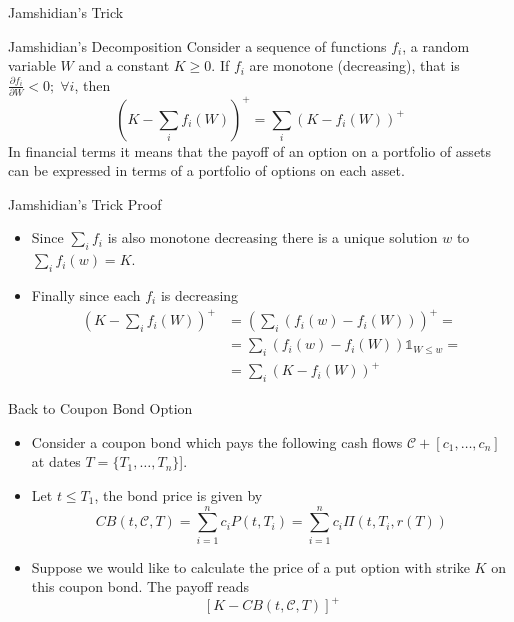 \documentclass{beamer}
\begin{document}
\begin{frame}{Jamshidian's Trick}
	\begin{block}{Jamshidian's Decomposition}
		Consider a sequence of functions $f_i$, a random variable $W$ and a constant $K\ge0$. If $f_i$ are monotone (decreasing), that is $\frac{\partial f_i}{\partial W} < 0;\;\forall i$, then 
		\begin{equation*}
			\left(K - \sum_i f_i(W)\right)^+ = 	\sum_i \left(K - f_i(W)\right)^+
		\end{equation*} 
		In financial terms it means that the payoff of an option on a portfolio of assets can be expressed in terms of a portfolio of options on each asset.
	\end{block}
\end{frame}

\begin{frame}{Jamshidian's Trick Proof}
	\begin{itemize}
	\item Since $\sum_i f_i$ is also monotone decreasing there is a unique solution $w$ to $\sum_i f_i(w) = K$.
	\item Finally since each $f_i$ is decreasing
	\begin{equation*}
		\begin{aligned}
		\left(K - \sum_i f_i(W)\right)^+ &= \left(\sum_i (f_i(w) -  f_i(W))\right)^+ = \\ 
		&= \sum_i (f_i(w) - f_i(W))\mathbb{1}_{W\le w} = \\ 
		&= \sum_i \left(K - f_i(W)\right)^+
		\end{aligned}
	\end{equation*}
\end{itemize}
\end{frame}

\begin{frame}{Back to Coupon Bond Option}
	\begin{itemize}
		\item Consider a coupon bond which pays the following cash flows $\mathcal{C}+[c_1,\dots,c_n]$ at dates $T=\{T_1,\ldots,T_n\}$].
		\item Let $t\leq T_1$, the bond price is given by
		\begin{equation*}
			CB(t,\mathcal{C},T)=\sum_{i=1}^n c_i P(t,T_i) =\sum_{i=1}^n c_i \Pi(t, T_i, r(T))
		\end{equation*}
		\item Suppose we would like to calculate the price of a put option with strike $K$ on this coupon bond. The payoff reads
		\begin{equation*}
			\left[K-CB(t,\mathcal{C},T)\right]^+
		\end{equation*}
	\end{itemize}
\end{frame}
\end{document}
